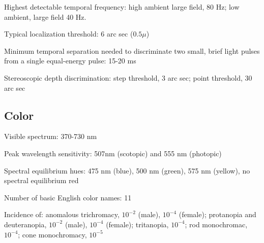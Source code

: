 \item Highest detectable temporal frequency:  high ambient large
field, 80 Hz; low ambient, large field 40 Hz.

\item Typical localization threshold: 6 arc sec ($0.5 \mu$)

\item Minimum temporal separation needed to discriminate two small, brief
light pulses from a single equal-energy pulse: 15-20 ms

\item Stereoscopic depth discrimination: step threshold, 3 arc sec;
point threshold, 30 arc sec

\ee

\subsection*{Color}

\be

\item Visible spectrum: 370-730 nm

\item Peak wavelength sensitivity: 507nm (scotopic) and 555 nm (photopic)

\item Spectral equilibrium hues: 475 nm (blue),
500 nm (green), 575 nm (yellow), no spectral equilibrium red

\item Number of basic English color names: 11

\item Incidence of:
anomalous trichromacy, $10^{-2}$ (male), $10^{-4}$ (female);
protanopia and deuteranopia, $10^{-2}$ (male), $10^{-4}$ (female);
tritanopia, $10^{-4}$; rod monochromac, $10^{-4}$; cone monochromacy,
$10^{-5}$

\ee



